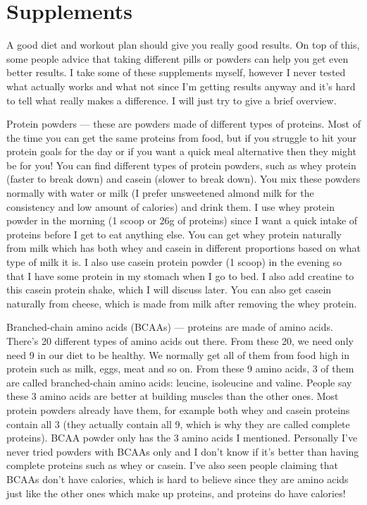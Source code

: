 \documentclass[openany, 12pt]{book}
\begin{document}
        \section{Supplements}

        A good diet and workout plan should give you really good results. On top of this, some people advice that taking different pills or powders can help you get even better results.
        I take some of these supplements myself, however I never tested what actually works and what not since I'm getting results anyway and it's hard to tell what really makes a difference.
        I will just try to give a brief overview.

        Protein powders --- these are powders made of different types of proteins. Most of the time you can get the same proteins from food, but if you struggle to hit your protein goals for
        the day or if you want a quick meal alternative then they might be for you! You can find different types of protein powders, such as whey protein (faster to break down) and casein
        (slower to break down). You mix these powders normally with water or milk (I prefer unsweetened almond milk for the consistency and low amount of calories) and drink them.
        I use whey protein powder in the morning (1 scoop or 26g of proteins) since I want a quick intake of proteins before I get to eat anything else. You can get whey protein naturally
        from milk which has both whey and casein in different proportions based on what type of milk it is. I also use casein protein powder (1 scoop)
        in the evening so that I have some protein in my stomach when I go to bed. I also add creatine to this casein protein shake, which I will discuss later. You can also get casein naturally
        from cheese, which is made from milk after removing the whey protein.

        Branched-chain amino acids (BCAAs) --- proteins are made of amino acids. There's 20 different types of amino
        acids out there. From these 20, we need only need 9 in our diet to be healthy. We normally get all of them from food
        high in protein such as milk, eggs, meat and so on. From these 9 amino acids, 3 of them are called branched-chain amino acids: leucine, isoleucine and valine. People say these 3 amino acids
        are better at building muscles than the other ones. Most protein powders already have them, for example both whey and casein proteins contain all 3 (they actually contain all 9, which is
        why they are called complete proteins). BCAA powder only has the 3 amino acids I mentioned. Personally I've never tried powders with BCAAs only and I don't know if it's better than having
        complete proteins such as whey or casein. I've also seen people claiming that BCAAs don't have calories, which is hard to believe since they are amino acids just like the other ones which
        make up proteins, and proteins do have calories!
\end{document}
